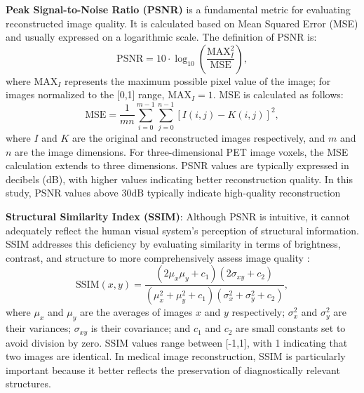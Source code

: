 \documentclass[12pt]{iopart}
\begin{document}
\textbf{Peak Signal-to-Noise Ratio (PSNR)} \cite{Hore2010PSNRvsSSIM} is a fundamental metric for evaluating reconstructed image quality. It is calculated based on Mean Squared Error (MSE) and usually expressed on a logarithmic scale. The definition of PSNR is:
\begin{equation}
\text{PSNR} = 10 \cdot \log_{10}\left(\frac{\text{MAX}_I^2}{\text{MSE}}\right),
\end{equation}
where $\text{MAX}_I$ represents the maximum possible pixel value of the image; for images normalized to the [0,1] range, $\text{MAX}_I = 1$. MSE is calculated as follows:
\begin{equation}
\text{MSE} = \frac{1}{mn}\sum_{i=0}^{m-1}\sum_{j=0}^{n-1}[I(i,j) - K(i,j)]^2,
\end{equation}
where $I$ and $K$ are the original and reconstructed images respectively, and $m$ and $n$ are the image dimensions. For three-dimensional PET image voxels, the MSE calculation extends to three dimensions.
PSNR values are typically expressed in decibels (dB), with higher values indicating better reconstruction quality. In this study, PSNR values above 30dB typically indicate high-quality reconstruction

\textbf{Structural Similarity Index (SSIM)}: Although PSNR is intuitive, it cannot adequately reflect the human visual system's perception of structural information. SSIM addresses this deficiency by evaluating similarity in terms of brightness, contrast, and structure to more comprehensively assess image quality \cite{Wang2004SSIM}:
\begin{equation}
\text{SSIM}(x, y) = \frac{(2\mu_x\mu_y + c_1)(2\sigma_{xy} + c_2)}{(\mu_x^2 + \mu_y^2 + c_1)(\sigma_x^2 + \sigma_y^2 + c_2)},
\end{equation}
where $\mu_x$ and $\mu_y$ are the averages of images $x$ and $y$ respectively; $\sigma_x^2$ and $\sigma_y^2$ are their variances; $\sigma_{xy}$ is their covariance; and $c_1$ and $c_2$ are small constants set to avoid division by zero.
SSIM values range between [-1,1], with 1 indicating that two images are identical. In medical image reconstruction, SSIM is particularly important because it better reflects the preservation of diagnostically relevant structures. 
\end{document}
